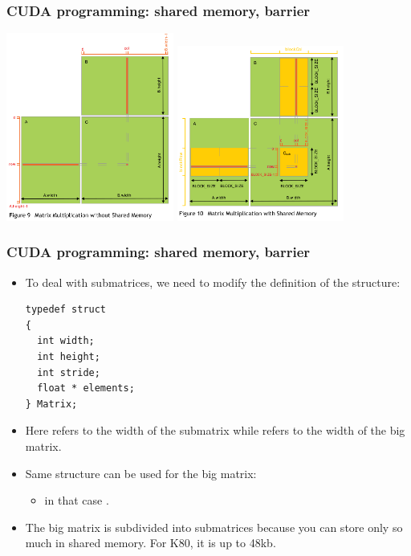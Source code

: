 \begin{frame}[fragile]
  \frametitle{CUDA programming: shared memory, barrier}
\includegraphics[width=5.5cm]{graphs/matMult1.png}
\includegraphics[width=5.5cm]{graphs/matMult2.png}
\end{frame}

\begin{frame}[fragile]
  \frametitle{CUDA programming: shared memory, barrier}
  \begin{itemize}
  \item To deal with submatrices, we need to modify the definition of the  structure:
    {\color{mycolorcode}
      {\tiny
\begin{verbatim}
typedef struct
{
  int width;
  int height;
  int stride;
  float * elements;
} Matrix;
\end{verbatim}
      }
    }
  \item Here  refers to the width of the submatrix while  refers to the width of the big matrix.
  \item Same structure can be used for the big matrix: 
    \begin{itemize}
    \item in that case .
    \end{itemize}
  \item The big matrix is subdivided into submatrices because you can store only so much in shared memory. For K80, it is up to 48kb.
  \end{itemize}
\end{frame}

